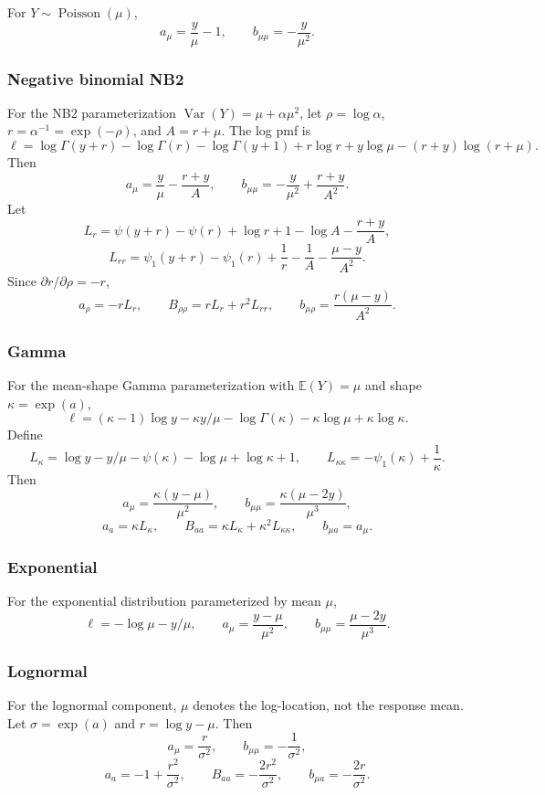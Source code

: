\documentclass{article}
\newcommand{\E}{\mathbb{E}}
\newcommand{\Var}{\operatorname{Var}}
\begin{document}
For $Y\sim\operatorname{Poisson}(\mu)$,
\[
    a_\mu=\frac{y}{\mu}-1,\qquad
    b_{\mu\mu}=-\frac{y}{\mu^2}.
\]

\subsubsection*{Negative binomial NB2}

For the NB2 parameterization $\Var(Y)=\mu+\alpha\mu^2$, let
$\rho=\log\alpha$, $r=\alpha^{-1}=\exp(-\rho)$, and $A=r+\mu$.  The log pmf is
\[
    \ell=
    \log\Gamma(y+r)-\log\Gamma(r)-\log\Gamma(y+1)
    +r\log r+y\log\mu-(r+y)\log(r+\mu).
\]
Then
\[
    a_\mu=\frac{y}{\mu}-\frac{r+y}{A},
    \qquad
    b_{\mu\mu}=-\frac{y}{\mu^2}+\frac{r+y}{A^2}.
\]
Let
\[
    L_r=\psi(y+r)-\psi(r)+\log r+1-\log A-\frac{r+y}{A},
\]
\[
    L_{rr}
    =
    \psi_1(y+r)-\psi_1(r)+\frac1r-\frac1A-\frac{\mu-y}{A^2}.
\]
Since $\partial r/\partial\rho=-r$,
\[
    a_\rho=-rL_r,\qquad
    B_{\rho\rho}=rL_r+r^2L_{rr},\qquad
    b_{\mu\rho}=\frac{r(\mu-y)}{A^2}.
\]

\subsubsection*{Gamma}

For the mean-shape Gamma parameterization with
$\E(Y)=\mu$ and shape $\kappa=\exp(a)$,
\[
    \ell
    =
    (\kappa-1)\log y-\kappa y/\mu-\log\Gamma(\kappa)
    -\kappa\log\mu+\kappa\log\kappa .
\]
Define
\[
    L_\kappa=\log y-y/\mu-\psi(\kappa)-\log\mu+\log\kappa+1,
    \qquad
    L_{\kappa\kappa}=-\psi_1(\kappa)+\frac1\kappa.
\]
Then
\[
    a_\mu=\frac{\kappa(y-\mu)}{\mu^2},\qquad
    b_{\mu\mu}=\frac{\kappa(\mu-2y)}{\mu^3},
\]
\[
    a_a=\kappa L_\kappa,\qquad
    B_{aa}=\kappa L_\kappa+\kappa^2L_{\kappa\kappa},\qquad
    b_{\mu a}=a_\mu.
\]

\subsubsection*{Exponential}

For the exponential distribution parameterized by mean $\mu$,
\[
    \ell=-\log\mu-y/\mu,\qquad
    a_\mu=\frac{y-\mu}{\mu^2},\qquad
    b_{\mu\mu}=\frac{\mu-2y}{\mu^3}.
\]

\subsubsection*{Lognormal}

For the lognormal component, $\mu$ denotes the log-location, not the response
mean.  Let $\sigma=\exp(a)$ and $r=\log y-\mu$.  Then
\[
    a_\mu=\frac{r}{\sigma^2},\qquad
    b_{\mu\mu}=-\frac{1}{\sigma^2},
\]
\[
    a_a=-1+\frac{r^2}{\sigma^2},\qquad
    B_{aa}=-\frac{2r^2}{\sigma^2},\qquad
    b_{\mu a}=-\frac{2r}{\sigma^2}.
\]
\end{document}
